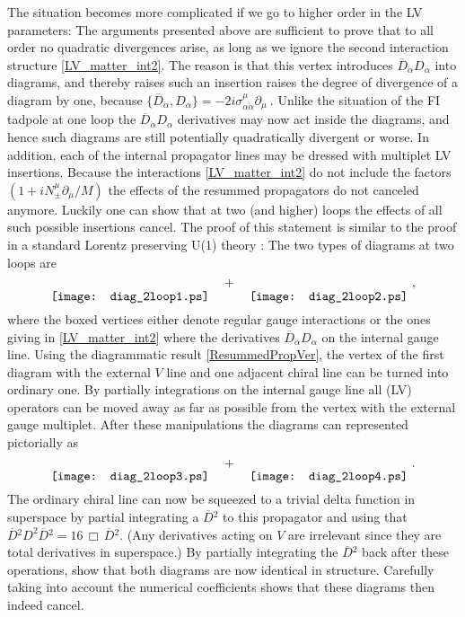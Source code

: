 \documentclass[12pt]{revtex4}
\begin{document}
The situation becomes more complicated if we go to higher order in 
the LV parameters: The arguments presented above are sufficient to
prove that to all order no quadratic divergences arise, as long as we
ignore the second interaction structure \eqref{LV_matter_int2}. The
reason is that this vertex introduces $\overline{D}_{\dot\alpha}
D_\alpha$ into diagrams, and thereby raises such an insertion raises
the degree of divergence of a diagram by one, because 
\(
\{\overline{D}_{\dot\alpha}, D_\alpha\} = 
-2 i \sigma_{\alpha\dot\alpha}^\mu \partial_\mu~.
\) 
Unlike the situation of the FI tadpole at one loop the
$\overline{D}_{\dot\alpha} D_\alpha$ derivatives may now act inside
the diagrams, and hence such diagrams 
are still potentially quadratically divergent or worse. In addition, 
each of the internal propagator lines may be dressed with multiplet LV
insertions. Because the interactions \eqref{LV_matter_int2} do
not include the factors $(1+i N_\pm^\mu \partial_\mu/M)$ the effects
of the resummed propagators do not canceled anymore. Luckily one 
can show that at two (and higher) loops the effects of all such
possible insertions cancel. The proof of this statement is similar to
the proof in a standard Lorentz preserving U(1) theory
\cite{Fischler:1981zk}: The two types of diagrams at two loops are 
\begin{equation}
\raisebox{-2.5ex}{\texttt{[image: diag\_2loop1.ps]}}
\quad + \quad 
\raisebox{-2.5ex}{\texttt{[image: diag\_2loop2.ps]}}
~,
\end{equation} 
where the boxed vertices either denote regular gauge interactions or
the ones giving in \eqref{LV_matter_int2} where the derivatives
$\overline{D}_{\dot\alpha} D_\alpha$ on the internal gauge line. 
Using the diagrammatic result \eqref{ResummedPropVer}, the vertex of 
the first diagram with the external $V$ line and one adjacent chiral
line can be turned into ordinary one. By partially integrations on
the internal gauge line all (LV) operators can be moved away as far as
possible from the vertex with the external gauge multiplet. After
these manipulations the diagrams can represented pictorially as  
\begin{equation}
\raisebox{-2.5ex}{\texttt{[image: diag\_2loop3.ps]}}
\quad + \quad 
\raisebox{-2.5ex}{\texttt{[image: diag\_2loop4.ps]}}
~.
\end{equation} 
The ordinary chiral line can now be squeezed to a trivial delta
function in superspace by partial integrating a $\overline{D}{}^2$ to
this propagator and using that 
$\overline{D}{}^2 D^2 \overline{D}{}^2 = 16\, \Box\, \overline{D}{}^2$. 
(Any derivatives acting on $V$ are irrelevant since they are total
derivatives in superspace.) By partially integrating the
$\overline{D}{}^2$ back after these operations, show that both diagrams
are now identical in structure. Carefully taking into account the
numerical coefficients shows that these diagrams then indeed cancel. 
\end{document}
